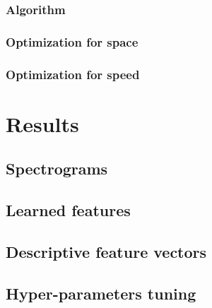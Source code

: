 \documentclass[a4paper,12pt,twoside]{report}
\begin{document}
\subsection{Algorithm}

\subsection{Optimization for space}

\subsection{Optimization for speed}

\chapter{Results}
\label{results}

\section{Spectrograms}

\section{Learned features}

\section{Descriptive feature vectors}

\section{Hyper-parameters tuning}
\end{document}

